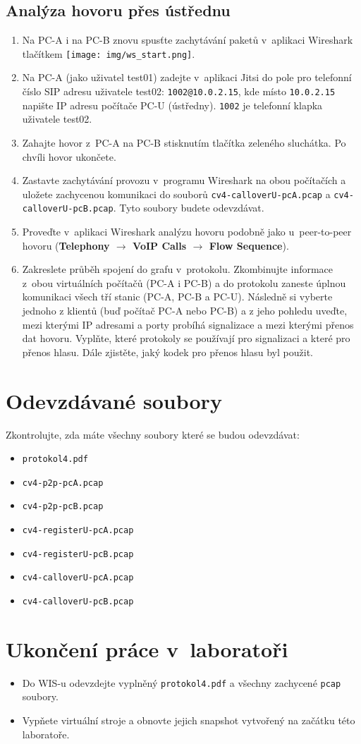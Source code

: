 \subsection{Analýza hovoru přes ústřednu}
\begin{enumerate}
    \item Na PC-A i na PC-B znovu spusťte zachytávání paketů v aplikaci Wireshark tlačítkem \texttt{[image: img/ws\_start.png]}.
    \item Na PC-A (jako uživatel test01) zadejte v~aplikaci Jitsi do pole pro telefonní číslo SIP adresu uživatele test02: {\tt 1002@10.0.2.15}, kde místo {\tt 10.0.2.15} napište IP adresu počítače PC-U (ústředny). {\tt 1002} je telefonní klapka uživatele test02.
    \item Zahajte hovor z~PC-A na PC-B stisknutím tlačítka zeleného sluchátka. Po chvíli hovor ukončete.
	\item Zastavte zachytávání provozu v~programu Wireshark na obou počítačích a uložete zachycenou komunikaci do souborů \texttt{cv4-calloverU-pcA.pcap} a \texttt{cv4-calloverU-pcB.pcap}. Tyto soubory budete odevzdávat.
	\item Proveďte v~aplikaci Wireshark analýzu hovoru podobně jako u~peer-to-peer hovoru ({\bf Telephony $\rightarrow$ VoIP Calls $\rightarrow$ \bf Flow Sequence}).
    \item Zakreslete průběh spojení do grafu v~protokolu. Zkombinujte informace z~obou virtuálních počítačů (PC-A i PC-B) a do protokolu zaneste úplnou komunikaci všech
      tří stanic (PC-A, PC-B a PC-U).
	  Následně si vyberte jednoho z klientů (buď počítač PC-A nebo PC-B) a z jeho pohledu uveďte, mezi kterými IP adresami a porty probíhá signalizace a mezi kterými přenos dat hovoru. Vyplňte, které protokoly se používají pro signalizaci a které pro přenos hlasu. Dále zjistěte, jaký kodek pro přenos hlasu byl použit.
\end{enumerate}


\section*{Odevzdávané soubory}
Zkontrolujte, zda máte všechny soubory které se budou odevzdávat:
\begin{itemize}
  \item \texttt{protokol4.pdf}
  \item \texttt{cv4-p2p-pcA.pcap}
  \item \texttt{cv4-p2p-pcB.pcap}
  \item \texttt{cv4-registerU-pcA.pcap}
  \item \texttt{cv4-registerU-pcB.pcap}
  \item \texttt{cv4-calloverU-pcA.pcap}
  \item \texttt{cv4-calloverU-pcB.pcap}
\end{itemize}

\section*{Ukončení práce v~laboratoři}
\begin{itemize}
	\item Do WIS-u odevzdejte vyplněný \texttt{protokol4.pdf} a všechny zachycené \texttt{pcap} soubory.
	\item Vypňete virtuální stroje a obnovte jejich snapshot vytvořený na začátku této laboratoře.
\end{itemize}
